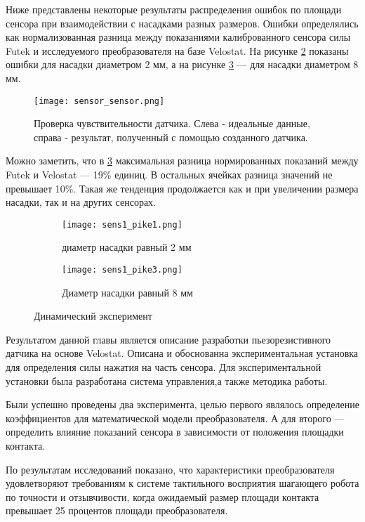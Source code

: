 Ниже  представлены некоторые результаты распределения ошибок по площади сенсора при взаимодействии с насадками разных размеров. Ошибки определялись как нормализованная разница между показаниями калиброванного сенсора силы Futek и исследуемого преобразователя на базе Velostat. На рисунке \ref{fig:sens1_pike1} показаны ошибки для насадки диаметром 2 мм, а на рисунке \ref{fig:sens1_pike3} — для насадки диаметром 8 мм.

\begin{figure}[H]
    \centering\texttt{[image: sensor\_sensor.png]}\\
    \caption{Проверка чувствительности датчика. Слева - идеальные данные, справа - результат, полученный с помощью созданного датчика.}
    \label{fig:sensor_sensor}
    \end{figure}

Можно заметить, что в \ref{fig:sens1_pike3} максимальная разница нормированных показаний между Futek и Velostat --- 19\% единиц. В остальных ячейках разница значений не превышает 10\%. Такая же тенденция продолжается как и при увеличении размера насадки, так и на других сенсорах.


\begin{figure}[H]
    \begin{subfigure}{0.99\textwidth}
        \centering\texttt{[image: sens1\_pike1.png]}
        \caption{диаметр насадки равный 2 мм }
        \label{fig:sens1_pike1}
    \end{subfigure}

    \begin{subfigure}{0.99\textwidth}
        \centering\texttt{[image: sens1\_pike3.png]}
        \caption{Диаметр насадки равный 8 мм }
        \label{fig:sens1_pike3}
    \end{subfigure}
    \caption{Динамический эксперимент}
    \label{fig:dynamics_exp}
\end{figure}

Результатом данной главы является описание разработки пьезорезистивного датчика на основе Velostat. Описана и обоснованна экспериментальная установка для определения силы нажатия на часть сенсора. Для экспериментальной установки была разработана система управления,а также методика работы. 

Были успешно проведены два эксперимента, целью первого являлось определение коэффициентов для математической модели преобразователя. А для второго --- определить влияние показаний сенсора в зависимости от положения площадки контакта. 

По результатам исследований показано, что характеристики преобразователя удовлетворяют требованиям к системе тактильного восприятия шагающего робота  по точности и отзывчивости, когда ожидаемый размер площади контакта превышает 25 процентов площади преобразователя.